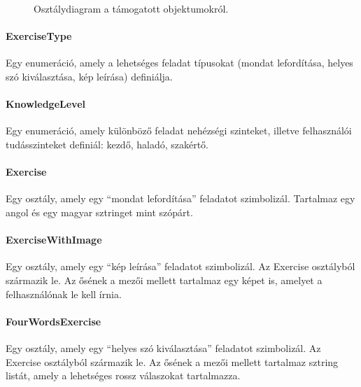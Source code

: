 \documentclass[11pt, a4paper]{article}
\begin{document}
    \begin{figure}[htbp]
    	\center
    	\caption{Osztálydiagram a támogatott objektumokról.}
    	\label{fig:objects-uml}
    \end{figure}
    
    \paragraph{ExerciseType} Egy enumeráció, amely a lehetséges feladat típusokat (mondat lefordítása, helyes szó kiválasztása, kép leírása) definiálja.
    
    \paragraph{KnowledgeLevel} Egy enumeráció, amely különböző feladat nehézségi szinteket, illetve felhasználói tudásszinteket definiál: kezdő, haladó, szakértő.
    
    \paragraph{Exercise} Egy osztály, amely egy ``mondat lefordítása'' feladatot szimbolizál. Tartalmaz egy angol és egy magyar sztringet mint szópárt.
    
    \paragraph{ExerciseWithImage} Egy osztály, amely egy ``kép leírása'' feladatot szimbolizál. Az Exercise osztályból származik le. Az ősének a mezői mellett tartalmaz egy képet is, amelyet a felhasználónak le kell írnia.
    
    \paragraph{FourWordsExercise} Egy osztály, amely egy ``helyes szó kiválasztása'' feladatot szimbolizál. Az Exercise osztályból származik le. Az ősének a mezői mellett tartalmaz sztring listát, amely a lehetséges rossz válaszokat tartalmazza.
    
\end{document}
